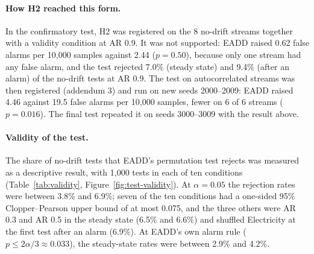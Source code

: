 \paragraph{How H2 reached this form.} In the confirmatory test, H2 was registered on the 8 no-drift streams together with a validity condition at AR 0.9. It was not supported: EADD raised 0.62 false alarms per 10,000 samples against 2.44 ($p = 0.50$), because only one stream had any false alarm, and the test rejected 7.0\% (steady state) and 9.4\% (after an alarm) of the no-drift tests at AR 0.9. The test on autocorrelated streams was then registered (addendum 3) and run on new seeds 2000--2009: EADD raised 4.46 against 19.5 false alarms per 10,000 samples, fewer on 6 of 6 streams ($p = 0.016$). The final test repeated it on seeds 3000--3009 with the result above.

\paragraph{Validity of the test.} The share of no-drift tests that EADD's permutation test rejects was measured as a descriptive result, with 1,000 tests in each of ten conditions (Table~\ref{tab:validity}, Figure~\ref{fig:test-validity}). At $\alpha = 0.05$ the rejection rates were between 3.8\% and 6.9\%; seven of the ten conditions had a one-sided 95\% Clopper--Pearson upper bound of at most 0.075, and the three others were AR 0.3 and AR 0.5 in the steady state (6.5\% and 6.6\%) and shuffled Electricity at the first test after an alarm (6.9\%). At EADD's own alarm rule ($p \leq 2\alpha/3 \approx 0.033$), the steady-state rates were between 2.9\% and 4.2\%.

